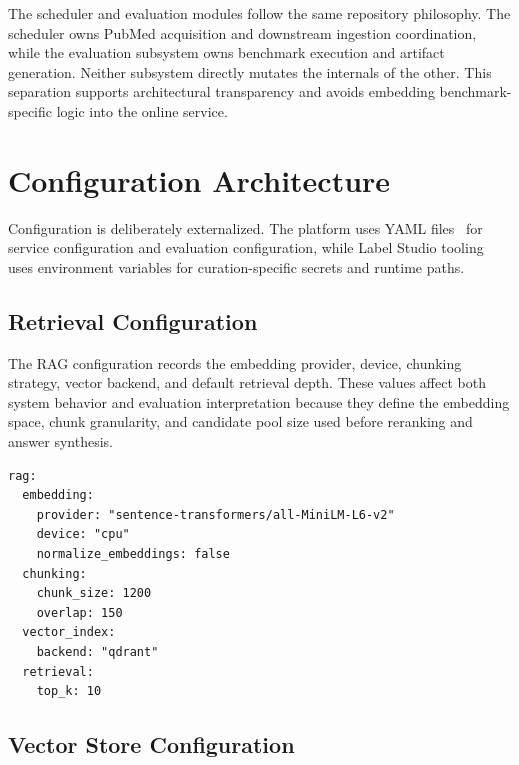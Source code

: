The scheduler and evaluation modules follow the same repository philosophy. The scheduler owns PubMed acquisition and downstream ingestion coordination, while the evaluation subsystem owns benchmark execution and artifact generation. Neither subsystem directly mutates the internals of the other. This separation supports architectural transparency and avoids embedding benchmark-specific logic into the online service.

\section{Configuration Architecture}

Configuration is deliberately externalized. The platform uses YAML files~\cite{yaml2021spec} for service configuration and evaluation configuration, while Label Studio tooling uses environment variables for curation-specific secrets and runtime paths.

\subsection{Retrieval Configuration}

The RAG configuration records the embedding provider, device, chunking strategy, vector backend, and default retrieval depth. These values affect both system behavior and evaluation interpretation because they define the embedding space, chunk granularity, and candidate pool size used before reranking and answer synthesis.

\begin{lstlisting}[language={},caption={Representative retrieval configuration.}]
rag:
  embedding:
    provider: "sentence-transformers/all-MiniLM-L6-v2"
    device: "cpu"
    normalize_embeddings: false
  chunking:
    chunk_size: 1200
    overlap: 150
  vector_index:
    backend: "qdrant"
  retrieval:
    top_k: 10
\end{lstlisting}

\subsection{Vector Store Configuration}

